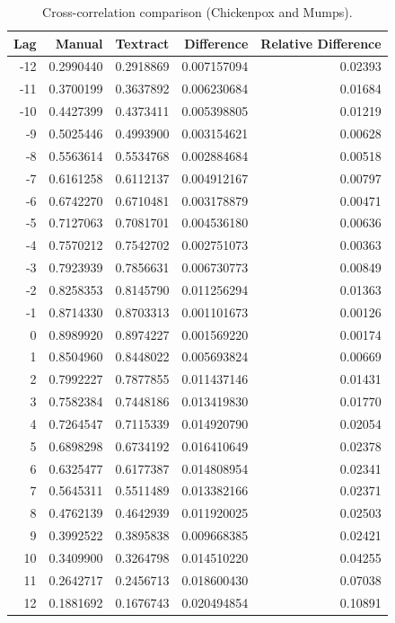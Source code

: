 \documentclass[12pt]{article}
\begin{document}
\begin{table}[h]
\centering
\begin{tabular}{rrrrr}
\hline
Lag & Manual & Textract & Difference & Relative Difference \\
\hline
-12 & 0.2990440 & 0.2918869 & 0.007157094 & 0.02393 \\
-11 & 0.3700199 & 0.3637892 & 0.006230684 & 0.01684 \\
-10 & 0.4427399 & 0.4373411 & 0.005398805 & 0.01219 \\
 -9 & 0.5025446 & 0.4993900 & 0.003154621 & 0.00628 \\
 -8 & 0.5563614 & 0.5534768 & 0.002884684 & 0.00518 \\
 -7 & 0.6161258 & 0.6112137 & 0.004912167 & 0.00797 \\
 -6 & 0.6742270 & 0.6710481 & 0.003178879 & 0.00471 \\
 -5 & 0.7127063 & 0.7081701 & 0.004536180 & 0.00636 \\
 -4 & 0.7570212 & 0.7542702 & 0.002751073 & 0.00363 \\
 -3 & 0.7923939 & 0.7856631 & 0.006730773 & 0.00849 \\
 -2 & 0.8258353 & 0.8145790 & 0.011256294 & 0.01363 \\
 -1 & 0.8714330 & 0.8703313 & 0.001101673 & 0.00126 \\
  0 & 0.8989920 & 0.8974227 & 0.001569220 & 0.00174 \\
  1 & 0.8504960 & 0.8448022 & 0.005693824 & 0.00669 \\
  2 & 0.7992227 & 0.7877855 & 0.011437146 & 0.01431 \\
  3 & 0.7582384 & 0.7448186 & 0.013419830 & 0.01770 \\
  4 & 0.7264547 & 0.7115339 & 0.014920790 & 0.02054 \\
  5 & 0.6898298 & 0.6734192 & 0.016410649 & 0.02378 \\
  6 & 0.6325477 & 0.6177387 & 0.014808954 & 0.02341 \\
  7 & 0.5645311 & 0.5511489 & 0.013382166 & 0.02371 \\
  8 & 0.4762139 & 0.4642939 & 0.011920025 & 0.02503 \\
  9 & 0.3992522 & 0.3895838 & 0.009668385 & 0.02421 \\
 10 & 0.3409900 & 0.3264798 & 0.014510220 & 0.04255 \\
 11 & 0.2642717 & 0.2456713 & 0.018600430 & 0.07038 \\
 12 & 0.1881692 & 0.1676743 & 0.020494854 & 0.10891 \\
\hline
\end{tabular}
\caption{Cross-correlation comparison (Chickenpox and Mumps).}
\label{table:chickenpoxmeasles}
\end{table}
\end{document}
